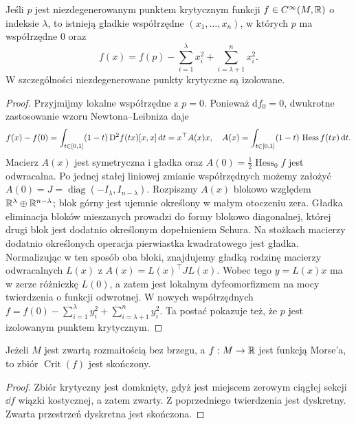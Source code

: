 \begin{twierdzenie}
\label{thm:morse-lemma-v10}
Jeśli $p$ jest niezdegenerowanym punktem krytycznym funkcji
$f\in C^\infty(M,\mathbb{R})$ o indeksie $\lambda$, to istnieją gładkie
współrzędne $(x_1,\ldots,x_n)$, w których $p$ ma współrzędne $0$ oraz
\[
 f(x)=f(p)-\sum_{i=1}^{\lambda}x_i^2+
                \sum_{i=\lambda+1}^{n}x_i^2.
\]
W szczególności niezdegenerowane punkty krytyczne są izolowane.
\end{twierdzenie}
\begin{proof}
Przyjmijmy lokalne współrzędne z $p=0$. Ponieważ
$\mathrm df_0=0$, dwukrotne zastosowanie wzoru Newtona--Leibniza daje
\[
f(x)-f(0)=\int_{t\in[0,1]}(1-t)\,\mathrm D^2f(tx)[x,x] \,\mathrm d t
=x^\top A(x)x,
\quad A(x)=\int_{t\in[0,1]}(1-t)\,\operatorname{Hess}f(tx)\,\mathrm d t.
\]
Macierz $A(x)$ jest symetryczna i gładka oraz
$A(0)=\tfrac12\operatorname{Hess}_0f$ jest odwracalna.
Po jednej stałej liniowej zmianie współrzędnych
możemy założyć $A(0)=J=\operatorname{diag}(-I_\lambda,I_{n-\lambda})$.
Rozpiszmy $A(x)$ blokowo względem
$\mathbb{R}^\lambda\oplus\mathbb{R}^{n-\lambda}$; blok górny jest
ujemnie określony w małym otoczeniu zera.
Gładka eliminacja bloków mieszanych prowadzi do
formy blokowo diagonalnej, której drugi blok jest
dodatnio określonym dopełnieniem Schura.
Na stożkach macierzy dodatnio określonych operacja
pierwiastka kwadratowego jest gładka.
Normalizując w ten sposób oba bloki, znajdujemy
gładką rodzinę macierzy odwracalnych $L(x)$ z
$A(x)=L(x)^\top J L(x)$.
Wobec tego $y=L(x)x$ ma w zerze różniczkę $L(0)$,
a zatem jest lokalnym dyfeomorfizmem na mocy twierdzenia
o funkcji odwrotnej. W nowych współrzędnych
$f=f(0)-\sum_{i=1}^\lambda y_i^2+\sum_{i=\lambda+1}^n y_i^2$.
Ta postać pokazuje też, że $p$ jest izolowanym punktem krytycznym.
\end{proof}

\begin{wniosek}
Jeżeli $M$ jest zwartą rozmaitością bez brzegu, a $f:M\to\mathbb{R}$ jest
funkcją Morse'a, to zbiór $\operatorname{Crit}(f)$ jest skończony.
\end{wniosek}
\begin{proof}
Zbiór krytyczny jest domknięty, gdyż jest miejscem zerowym ciągłej
sekcji $\dd f$ wiązki kostycznej, a zatem zwarty. Z poprzedniego
twierdzenia jest dyskretny. Zwarta przestrzeń dyskretna jest skończona.
\end{proof}

